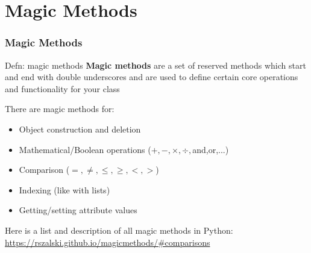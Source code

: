 \documentclass{beamer}
\begin{document}
\section{Magic Methods}

\begin{frame}	
\end{frame}

\begin{frame}	
	\frametitle{Magic Methods}
	
	\begin{alertblock}{Defn: magic methods}
		\textbf{Magic methods} are a set of reserved methods which start and end with double underscores and are used to define certain core operations and functionality for your class
		
		\vspace{10pt}
		There are magic methods for:
		\begin{itemize}
			\item Object construction and deletion
			\item Mathematical/Boolean operations ($+,-,\times,\div,$and,or,...)
			\item Comparison ($=,\ne,\le,\ge,<,>$)
			\item Indexing (like with lists)
			\item Getting/setting attribute values
		\end{itemize}
		
		\vspace{10pt}
		Here is a list and description of all magic methods in Python: \\
		\href{https://rszalski.github.io/magicmethods/\#comparisons}{https://rszalski.github.io/magicmethods/\#comparisons}
	\end{alertblock}
	
\end{frame}
\end{document}

